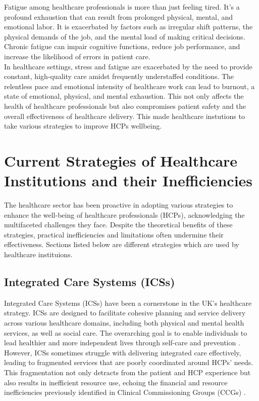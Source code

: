 \noindent Fatigue among healthcare professionals is more than just feeling tired. It’s a profound exhaustion that can result from prolonged physical, mental, and emotional labor. It is exacerbated by factors such as irregular shift patterns, the physical demands of the job, and the mental load of making critical decisions. Chronic fatigue can impair cognitive functions, reduce job performance, and increase the likelihood of errors in patient care. \\

\noindent In healthcare settings, stress and fatigue are exacerbated by the need to provide constant, high-quality care amidst frequently understaffed conditions. The relentless pace and emotional intensity of healthcare work can lead to burnout, a state of emotional, physical, and mental exhaustion. This not only affects the health of healthcare professionals but also compromises patient safety and the overall effectiveness of healthcare delivery. This made healthcare instutions to take various strategies to improve HCPs wellbeing.


\section{Current Strategies of Healthcare Institutions and their Inefficiencies}

The healthcare sector has been proactive in adopting various strategies to enhance the well-being of healthcare professionals (HCPs), acknowledging the multifaceted challenges they face. Despite the theoretical benefits of these strategies, practical inefficiencies and limitations often undermine their effectiveness. Sections listed below  are different strategies which are used by healthcare instituions.

\subsection{Integrated Care Systems (ICSs)}

Integrated Care Systems (ICSs) have been a cornerstone in the UK's healthcare strategy. ICSs are designed to facilitate cohesive planning and service delivery across various healthcare domains, including both physical and mental health services, as well as social care. The overarching goal is to enable individuals to lead healthier and more independent lives through self-care and prevention \cite{ref9}. However, ICSs sometimes struggle with delivering integrated care effectively, leading to fragmented services that are poorly coordinated around HCPs' needs. This fragmentation not only detracts from the patient and HCP experience but also results in inefficient resource use, echoing the financial and resource inefficiencies previously identified in Clinical Commissioning Groups (CCGs) \cite{ref11,ref12}.

